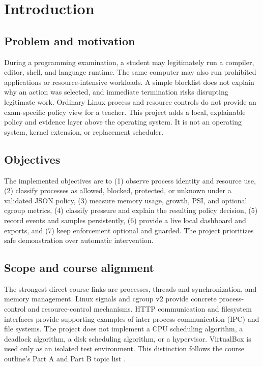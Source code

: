 \documentclass[12pt,a4paper]{article}
\begin{document}
\tableofcontents
\clearpage
{}

\section{Introduction}
\subsection{Problem and motivation}
During a programming examination, a student may legitimately run a compiler, editor, shell, and language runtime. The same computer may also run prohibited applications or resource-intensive workloads. A simple blocklist does not explain why an action was selected, and immediate termination risks disrupting legitimate work. Ordinary Linux process and resource controls do not provide an exam-specific policy view for a teacher. This project adds a local, explainable policy and evidence layer above the operating system. It is not an operating system, kernel extension, or replacement scheduler.

\subsection{Objectives}
The implemented objectives are to (1) observe process identity and resource use, (2) classify processes as allowed, blocked, protected, or unknown under a validated JSON policy, (3) measure memory usage, growth, PSI, and optional cgroup metrics, (4) classify pressure and explain the resulting policy decision, (5) record events and samples persistently, (6) provide a live local dashboard and exports, and (7) keep enforcement optional and guarded. The project prioritizes safe demonstration over automatic intervention.

\subsection{Scope and course alignment}
The strongest direct course links are processes, threads and synchronization, and memory management. Linux signals and cgroup v2 provide concrete process-control and resource-control mechanisms. HTTP communication and filesystem interfaces provide supporting examples of inter-process communication (IPC) and file systems. The project does not implement a CPU scheduling algorithm, a deadlock algorithm, a disk scheduling algorithm, or a hypervisor. VirtualBox is used only as an isolated test environment. This distinction follows the course outline's Part A and Part B topic list \cite{course-outline}.
\end{document}
